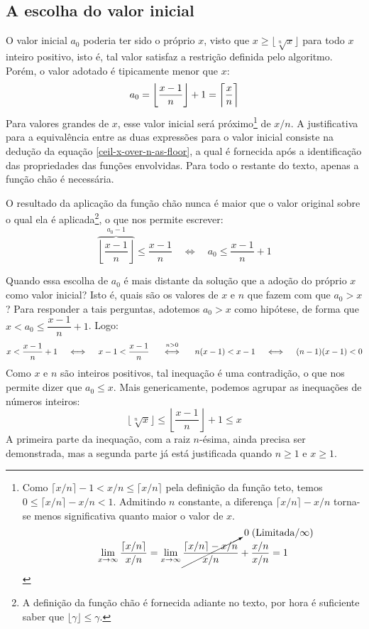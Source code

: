 \subsection*{A escolha do valor inicial}

O valor inicial $a_0$ poderia ter sido o próprio $x$,
visto que $x \ge \lfloor \sqrt[n]{x} \rfloor$
para todo $x$ inteiro positivo,
isto é, tal valor satisfaz a restrição definida pelo algoritmo.
Porém, o valor adotado é tipicamente menor que $x$:
\[
  a_0 = \left\lfloor \dfrac{x - 1}{n} \right\rfloor + 1
      = \left\lceil \dfrac{x\vphantom{l}}{n} \right\rceil
\]
Para valores grandes de $x$, esse valor inicial será próximo\footnote{
  Como $\lceil x/n \rceil - 1 < x/n \le \lceil x/n \rceil$
  pela definição da função teto,
  temos $0 \le \lceil x/n \rceil - x/n < 1$.
  Admitindo $n$ constante, a diferença $\lceil x/n \rceil - x/n$
  torna-se menos significativa quanto maior o valor de $x$.
  \[
    \lim_{x\to\infty} \dfrac{\lceil x/n \rceil}{x/n}
    =
    \lim_{x\to\infty} \cancelto{0\;(\text{Limitada}/\infty)}{
                        \dfrac{\lceil x/n \rceil - x/n}{x/n}
                      } +
                      \dfrac{x/n}{x/n}
    = 1
  \]
}
de $x/n$.
A justificativa para a equivalência
entre as duas expressões para o valor inicial
consiste na dedução da equação \eqref{ceil-x-over-n-as-floor}, a qual
é fornecida após a identificação das propriedades
das funções envolvidas.
Para todo o restante do texto, apenas a função chão é necessária.

O resultado da aplicação da função chão
nunca é maior que o valor original
sobre o qual ela é aplicada\footnote{
  A definição da função chão é fornecida adiante no texto,
  por hora é suficiente saber que $\lfloor \gamma \rfloor \le \gamma$.
},
o que nos permite escrever:
\[
  \overbrace{\left\lfloor \dfrac{x - 1}{n} \right\rfloor}^{a_0 - 1}
  \le \dfrac{x - 1}{n}
  \quad\iff\quad
  a_0 \le \dfrac{x - 1}{n} + 1
\]

Quando essa escolha de $a_0$
é mais distante da solução
que a adoção do próprio $x$ como valor inicial?
Isto é, quais são os valores de $x$ e $n$
que fazem com que $a_0 > x$?
Para responder a tais perguntas,
adotemos $a_0 > x$ como hipótese,
de forma que $x < a_0 \le \dfrac{x - 1}{n} + 1$.
Logo:
\[
  x < \dfrac{x - 1}{n} + 1
  \quad\iff\quad
  x - 1 < \dfrac{x - 1}{n}
  \quad\stackfirst{n > 0}{\iff}\quad
  n(x - 1) < x - 1
  \quad\iff\quad
  (n - 1)(x - 1) < 0
\]
Como $x$ e $n$ são inteiros positivos,
tal inequação é uma contradição,
o que nos permite dizer que $a_0 \le x$.
Mais genericamente,
podemos agrupar as inequações de números inteiros:
\[
  \lfloor \sqrt[n]{x} \rfloor
  \le
  \left\lfloor \dfrac{x - 1}{n} \right\rfloor + 1
  \le
  x
\]
A primeira parte da inequação, com a raiz $n$-ésima,
ainda precisa ser demonstrada,
mas a segunda parte já está justificada quando $n \ge 1$ e $x \ge 1$.
